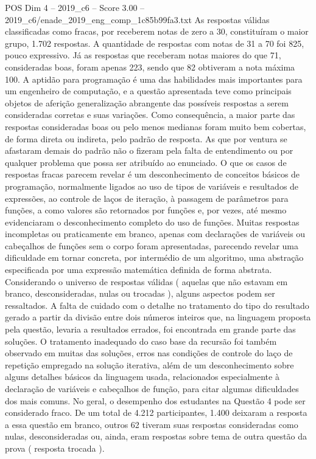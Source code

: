 \begin{textsample}{POS Dim 4 – 2019\_c6 – Score 3.00 – 2019\_c6/enade\_2019\_eng\_comp\_1c85b99fa3.txt}
As respostas válidas classificadas como fracas, por receberem notas de zero a 30, constituíram o maior grupo, 1.702 respostas.
A quantidade de respostas com notas de 31 a 70 foi 825, pouco expressivo.
Já as respostas que receberam notas maiores do que 71, consideradas boas, foram apenas 223, sendo que 82 obtiveram a nota máxima 100.
A aptidão para programação é uma das habilidades mais importantes para um engenheiro de computação, e a questão apresentada teve como principais objetos de aferição generalização abrangente das possíveis respostas a serem consideradas corretas e suas variações.
Como consequência, a maior parte das respostas consideradas boas ou pelo menos medianas foram muito bem cobertas, de forma direta ou indireta, pelo padrão de resposta.
As que por ventura se afastaram demais do padrão não o fizeram pela falta de entendimento ou por qualquer problema que possa ser atribuído ao enunciado.
O que os casos de respostas fracas parecem revelar é um desconhecimento de conceitos básicos de programação, normalmente ligados ao uso de tipos de variáveis e resultados de expressões, ao controle de laços de iteração, à passagem de parâmetros para funções, a como valores são retornados por funções e, por vezes, até mesmo evidenciaram o desconhecimento completo do uso de funções.
Muitas respostas incompletas ou praticamente em branco, apenas com declarações de variáveis ou cabeçalhos de funções sem o corpo foram apresentadas, parecendo revelar uma dificuldade em tornar concreta, por intermédio de um algoritmo, uma abstração especificada por uma expressão matemática definida de forma abstrata.
Considerando o universo de respostas válidas ( aquelas que não estavam em branco, desconsideradas, nulas ou trocadas ), alguns aspectos podem ser ressaltados.
A falta de cuidado com o detalhe no tratamento do tipo do resultado gerado a partir da divisão entre dois números inteiros que, na linguagem proposta pela questão, levaria a resultados errados, foi encontrada em grande parte das soluções.
O tratamento inadequado do caso base da recursão foi também observado em muitas das soluções, erros nas condições de controle do laço de repetição empregado na solução iterativa, além de um desconhecimento sobre alguns detalhes básicos da linguagem usada, relacionados especialmente à declaração de variáveis e cabeçalhos de função, para citar algumas dificuldades dos mais comuns.
No geral, o desempenho dos estudantes na Questão 4 pode ser considerado fraco.
De um total de 4.212 participantes, 1.400 deixaram a resposta a essa questão em branco, outros 62 tiveram suas respostas consideradas como nulas, desconsideradas ou, ainda, eram respostas sobre tema de outra questão da prova ( resposta trocada ).

\end{textsample}
